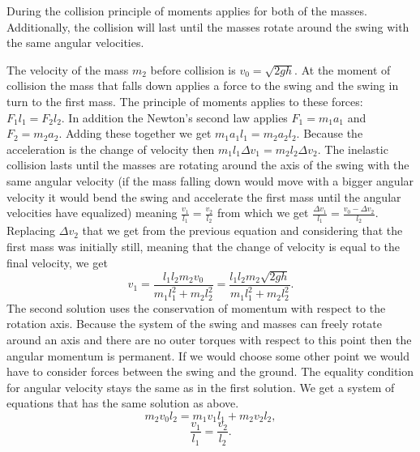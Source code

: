 \hinteng
During the collision principle of moments applies for both of the masses. Additionally, the collision will last until the masses rotate around the swing with the same angular velocities.

\solueng
The velocity of the mass $m_2$ before collision is $v_0=\sqrt{2gh}$. At the moment of collision the mass that falls down applies a force to the swing and the swing in turn to the first mass. The principle of moments applies to these forces:  $F_1l_1=F_2l_2$. In addition the Newton’s second law applies $F_1=m_1a_1$ and $F_2=m_2a_2$. Adding these together we get $m_1a_1l_1=m_2a_2l_2$. Because the acceleration is the change of velocity then $m_1l_1\Delta v_1=m_2l_2\Delta v_2$. The inelastic collision lasts until the masses are rotating around the axis of the swing with the same angular velocity (if the mass falling down would move with a bigger angular velocity it would bend the swing and accelerate the first mass until the angular velocities have equalized) meaning $\frac{v_1}{l_1}=\frac{v_2}{l_2}$ from which we get $\frac{\Delta v_1}{l_1}=\frac{v_0-\Delta v_2}{l_2}$. Replacing $\Delta v_2$ that we get from the previous equation and considering that the first mass was initially still, meaning that the change of velocity is equal to the final velocity, we get
\[
v_1=\frac{l_1l_2m_2v_0}{m_1l_1^2+m_2l_2^2}=\frac{l_1l_2m_2\sqrt{2gh}}{m_1l_1^2+m_2l_2^2}.
\] 
The second solution uses the conservation of momentum with respect to the rotation axis. Because the system of the swing and masses can freely rotate around an axis and there are no outer torques with respect to this point then the angular momentum is permanent. If we would choose some other point we would have to consider forces between the swing and the ground. The equality condition for angular velocity stays the same as in the first solution. We get a system of equations that has the same solution as above.
\[
 m_2v_0l_2=m_1v_1l_1+m_2v_2l_2,
\] 
\[
\frac{v_1}{l_1}=\frac{v_2}{l_2}.
\]
\probend